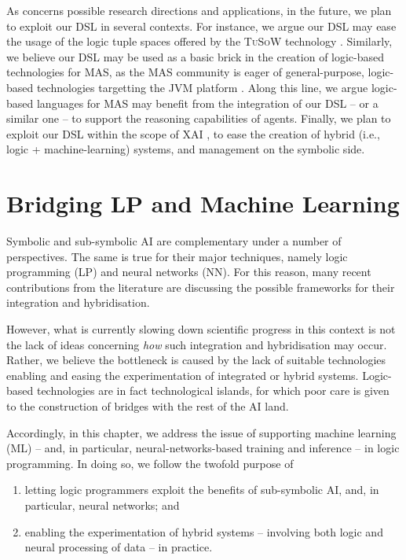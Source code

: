 \documentclass[12pt,a4paper,openright,twoside]{book}
\begin{document}
As concerns possible research directions and applications, in the future, we plan to exploit our DSL in several contexts.
%
For instance, we argue our DSL may ease the usage of the logic tuple spaces offered by the \textsc{TuSoW} technology \cite{tusow-icccn2019}.
%
Similarly, we believe our DSL may be used as a basic brick in the creation of logic-based technologies for MAS, as the MAS community is eager of general-purpose, logic-based technologies targetting the JVM platform \cite{lptech4mas-jaamas35}.
%
Along this line, we argue logic-based languages for MAS may benefit from the integration of our DSL -- or a similar one -- to support the reasoning capabilities of agents.
%
Finally, we plan to exploit our DSL within the scope of XAI \cite{xaisurvey-ia14}, to ease the creation of hybrid (i.e., logic + machine-learning) systems, and management on the symbolic side.


\chapter{Bridging LP and Machine Learning}


Symbolic and sub-symbolic AI are complementary under a number of perspectives.
%
The same is true for their major techniques, namely logic programming (LP) and neural networks (NN).
%
For this reason, many recent contributions from the literature are discussing the possible frameworks for their integration and hybridisation.

However, what is currently slowing down scientific progress in this context is not the lack of ideas concerning \emph{how} such integration and hybridisation may occur.
%
Rather, we believe the bottleneck is caused by the lack of suitable technologies enabling and easing the experimentation of integrated or hybrid systems.
%
Logic-based technologies are in fact technological islands, for which poor care is given to the construction of bridges with the rest of the AI land.

Accordingly, in this chapter, we address the issue of supporting machine learning (ML) -- and, in particular, neural-networks-based training and inference -- in logic programming.
%
In doing so, we follow the twofold purpose of
%
\begin{enumerate}
    \item letting logic programmers exploit the benefits of sub-symbolic AI, and, in particular, neural networks; and
    \item enabling the experimentation of hybrid systems -- involving both logic and neural processing of data -- in practice.
\end{enumerate}
\end{document}
